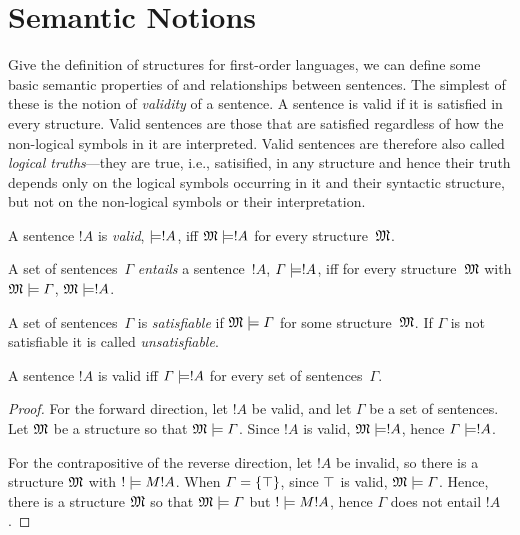 \documentclass[open-logic-section]{subfiles}
\begin{document}
\section{Semantic Notions}

\begin{wordy}
Give the definition of structures for first-order languages, we can
define some basic semantic properties of and relationships between
sentences.  The simplest of these is the notion of \emph{validity} of
a sentence.  A sentence is valid if it is satisfied in every
structure.  Valid sentences are those that are satisfied regardless of
how the non-logical symbols in it are interpreted.  Valid sentences
are therefore also called \emph{logical truths}---they are true, i.e.,
satisified, in any structure and hence their truth depends only on the
logical symbols occurring in it and their syntactic structure, but not
on the non-logical symbols or their interpretation.  
\end{wordy}

\begin{defn}[Validity]
A sentence $!A$ is \emph{valid}, $\Entails !A$, iff $\Sat{M}{!A}$ for every
structure~$\mathfrak M$.
\end{defn}

\begin{defn}[Entailment]
A set of sentences~$\Gamma$ \emph{entails} a sentence~$!A$, $\Gamma
\Entails !A$, iff for every structure~$\mathfrak M$ with
$\Sat{M}{\Gamma}$, $\Sat{M}{!A}$.
\end{defn}

\begin{defn}[Satisfiability]
A set of sentences~$\Gamma$ is \emph{satisfiable} if $\Sat{M}{\Gamma}$
for some structure~$\mathfrak M$.  If $\Gamma$ is not satisfiable it is
called \emph{unsatisfiable}.
\end{defn}

\begin{prop}
A sentence $!A$ is valid iff $\Gamma \Entails !A$ for every set of
sentences~$\Gamma$.
\end{prop}

\begin{proof}
For the forward direction, let $!A$ be valid, and let $\Gamma$ be a set of sentences. Let $\mathfrak M$ be a structure so that $\Sat{M}{\Gamma}$. Since $!A$ is valid, $\Sat{M}{!A}$, hence $\Gamma \Entails !A$.

For the contrapositive of the reverse direction, let $!A$ be invalid, so there is a structure $\mathfrak M$ with $\Sat!{M}{!A}$. When $\Gamma = \{ \top \}$, since $\top$ is valid, $\Sat{M}{\Gamma}$. Hence, there is a structure $\mathfrak M$ so that $\Sat{M}{\Gamma}$ but $\Sat!{M}{!A}$, hence $\Gamma$ does not entail $!A$.
\end{proof}
\end{document}

